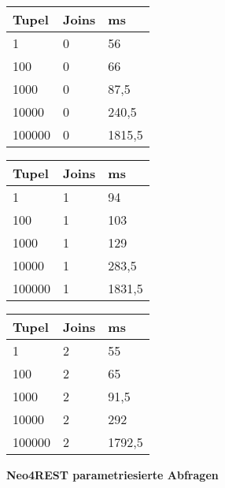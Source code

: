 \begin{table}[H]
\centering
\begin{subtable}[t]{0.3\textwidth}
\centering
\begin{tabular}{|l|l|l|}
\hline
Tupel  & Joins & ms    \\ \hline
1      & 0     & 56   \\ \hline
100    & 0     & 66   \\ \hline
1000   & 0     & 87,5   \\ \hline
10000  & 0     & 240,5   \\ \hline
100000 & 0     &  1815,5\\ \hline
\end{tabular}
\end{subtable}%
\hfill
\begin{subtable}[t]{0.3\textwidth}
\centering
\begin{tabular}{|l|l|l|}
\hline
Tupel  & Joins & ms    \\ \hline
1      & 1     & 94   \\ \hline
100    & 1     & 103   \\ \hline
1000   & 1     & 129   \\ \hline
10000  & 1     & 283,5 \\ \hline
100000 & 1     & 1831,5   \\ \hline
\end{tabular}
\end{subtable}%
\hfill
\begin{subtable}[t]{0.3\textwidth}
\centering
\begin{tabular}{|l|l|l|}
\hline
Tupel  & Joins & ms    \\ \hline
1      & 2     & 55   \\ \hline
100    & 2     & 65 \\ \hline
1000   & 2     & 91,5   \\ \hline
10000  & 2     & 292   \\ \hline
100000 & 2     & 1792,5 \\ \hline
\end{tabular}
\end{subtable}
\end{table}
\noindent
\textbf{Neo4REST parametriesierte Abfragen}
